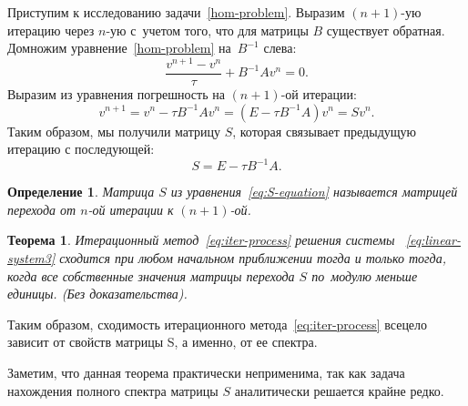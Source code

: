 \documentclass[11pt,a4paper,twoside]{report}
\numberwithin{equation}{section}
\newtheorem*{definition}{Определение}
\theoremstyle{definition}
\theoremstyle{plain}
\newtheorem{theorem}{Теорема}[section]
\begin{document}
Приступим к исследованию задачи~\eqref{hom-problem}.
Выразим $(n+1)$-ую итерацию через $n$-ую с~учетом того, что для матрицы $B$
существует обратная.
Домножим уравнение~\eqref{hom-problem} на~$B^{-1}$ слева:
%
$$
    \frac{v^{n+1} - v^n}{\tau} + B^{-1}Av^n = 0.
$$
%
Выразим из уравнения погрешность на $(n+1)$-ой итерации:
%
$$
    v^{n+1} = v^n - {\tau}B^{-1}Av^n = (E - {\tau}B^{-1}A)v^n = Sv^n.
$$
%
Таким образом, мы получили матрицу $S$, которая связывает предыдущую
итерацию с последующей:
%
\begin{equation}
    \label{eq:S-equation}
    S = E - {\tau}B^{-1}A.
\end{equation}
%
%
\begin{definition}
    Матрица $S$ из уравнения~\eqref{eq:S-equation} называется
    матрицей перехода от $n$-ой итерации к $(n+1)$-ой.
\end{definition}
%
%
\begin{theorem}
    \label{thm:theorem1}
    Итерационный метод~\eqref{eq:iter-process} решения системы
   ~\eqref{eq:linear-system3} сходится при любом начальном приближении тогда и
    только тогда, когда все собственные значения матрицы перехода $S$
    по~модулю меньше единицы. (Без доказательства).
\end{theorem}
%

Таким образом, сходимость итерационного метода~\eqref{eq:iter-process}
всецело зависит от свойств матрицы S, а именно, от ее спектра.

Заметим, что данная теорема практически неприменима, так как задача нахождения
полного спектра матрицы $S$ аналитически решается крайне редко.
\end{document}
